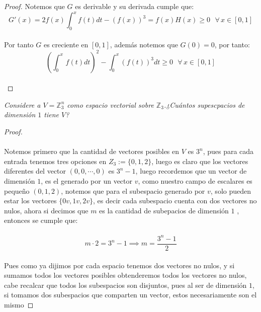 \documentclass[11pt,letterpaper]{article}
\newcommand{\Z}{\mathbb{Z}}
\begin{document}
\begin{proof}
    Notemos que $G$ es derivable y su derivada cumple que:\,\\
    \begin{equation*}
        G'(x)=2f(x)\int_{0}^{x} f(t)dt-(f(x))^3=f(x)H(x)\geq 0\,\,\,\,\forall\,x\in[0,1]
    \end{equation*}\,\\
    Por tanto $G$ es creciente en $[0,1]$, adem\'as notemos que $G(0)=0$, por tanto:\,\\
    \begin{equation*}
        \left(\int_{0}^{x}\,f(t)dt\right)^2-\int_{0}^{x}(f(t))^3dt\geq 0\,\,\,\,\forall\,x\in[0,1]
    \end{equation*}\,\\
\end{proof}
\begin{tcolorbox}[ 
	title = \textcolor{black}{\textcolor{white}{Problema 5}},]
\textit{ Considere a $V=\Z_{3}^n$ como espacio vectorial sobre $\Z_3$.¿Cu\'antos supescpacios de dimensi\'on $1$ tiene $V$?}
\end{tcolorbox}
\begin{proof}\,\\
    \,\\
    Notemos primero que la cantidad de vectores posibles en $V$ es $3^n$, pues para cada entrada tenemos tres opciones en $Z_3:=\{0,1,2\}$, luego es claro que los vectores diferentes del vector $(0,0,\cdots,0)$ es $3^n-1$,
    luego recordemos que un vector de dimensi\'on $1$, es el generado por un vector $v$, como nuestro campo de escalares es pequeño $(0,1,2)$, notemos que
    para el subespacio generado por $v$, solo pueden estar los vectores $\{0v,1v,2v\}$, es decir cada subespacio cuenta con dos vectores no nulos, ahora si decimos que $m$ es la cantidad de subepacios de dimensi\'on $1$ , entonces se cumple que:\,\\
    \,\\
    \begin{equation*}
        m\cdot 2=3^n-1\implies m=\frac{3^n-1}{2}
    \end{equation*}\,\\
    Pues como ya dijimos por cada espacio tenemos dos vectores no nulos, y si sumamos todos los vectores posibles obtenderemos todos los vectores no nulos, cabe recalcar que todos los subespacios son disjuntos, pues al ser de dimensi\'on $1$, si tomamos dos subespacios que comparten un vector, estos necesariamente son el mismo
\end{proof}
\end{document}
